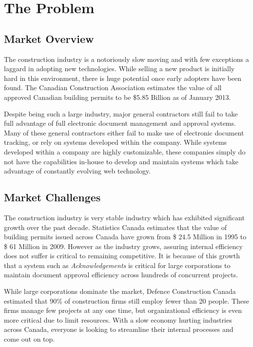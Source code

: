 \section{The Problem}

\subsection{Market Overview}
The construction industry is a notoriously slow moving and with few exceptions a laggard in adopting new technologies. While selling a new product is initially hard in this environment, there is huge potential once early adopters have been found. The Canadian Construction Association estimates the value of all approved Canadian building permits to be \$5.85 Billion as of January 2013.

Despite being such a large industry, major general contractors still fail to take full advantage of full electronic document management and approval systems. Many of these general contractors either fail to make use of electronic document tracking, or rely on systems developed within the company. While systems developed within a company are highly customizable, these companies simply do not have the capabilities in-house to develop and maintain systems which take advantage of constantly evolving web technology.

\subsection{Market Challenges}

The construction industry is very stable industry which has exhibited significant growth over the past decade. Statistics Canada estimates that the value of building permits issued across Canada have grown from \$ 24.5 Million in 1995 to \$ 61 Million in 2009. However as the industry grows, assuring internal efficiency does not suffer is critical to remaining competitive. It is because of this growth that a system such as {\it Acknowledgements} is critical for large corporations to maintain document approval efficiency across hundreds of concurrent projects.

While large corporations dominate the market, Defence Construction Canada estimated that 90\% of construction firms still employ fewer than 20 people. These firms manage few projects at any one time, but organizational efficiency is even more critical due to limit resources. With a slow economy hurting industries across Canada, everyone is looking to streamline their internal processes and come out on top.

